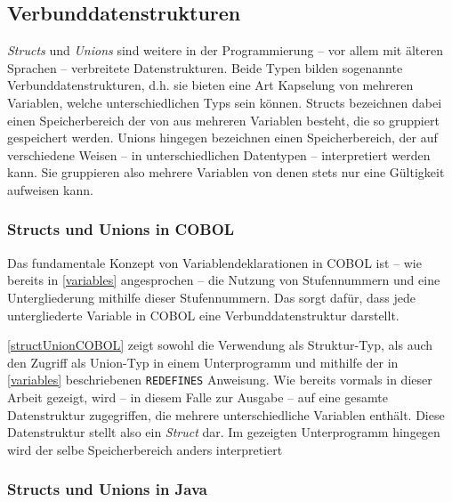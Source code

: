 \subsection{Verbunddatenstrukturen}
\textit{Structs} und \textit{Unions} sind weitere in der Programmierung -- vor allem mit älteren Sprachen -- verbreitete Datenstrukturen. Beide Typen bilden sogenannte Verbunddatenstrukturen, d.h. sie bieten eine Art Kapselung von mehreren Variablen, welche unterschiedlichen Typs sein können. Structs bezeichnen dabei einen Speicherbereich der von aus mehreren Variablen besteht, die so gruppiert gespeichert werden. Unions hingegen bezeichnen einen Speicherbereich, der auf verschiedene Weisen -- in unterschiedlichen Datentypen -- interpretiert werden kann. Sie gruppieren also mehrere Variablen von denen stets nur eine Gültigkeit aufweisen kann.

\subsubsection*{Structs und Unions in COBOL}

Das fundamentale Konzept von Variablendeklarationen in COBOL ist -- wie bereits in \autoref{variables} angesprochen -- die Nutzung von Stufennummern und eine Untergliederung mithilfe dieser Stufennummern. Das sorgt dafür, dass jede untergliederte Variable in COBOL eine Verbunddatenstruktur darstellt.


\autoref{structUnionCOBOL} zeigt sowohl die Verwendung als Struktur-Typ, als auch den Zugriff als Union-Typ in einem Unterprogramm und mithilfe der in \autoref{variables} beschriebenen \texttt{REDEFINES} Anweisung. Wie bereits vormals in dieser Arbeit gezeigt, wird -- in diesem Falle zur Ausgabe -- auf eine gesamte Datenstruktur zugegriffen, die mehrere unterschiedliche Variablen enthält. Diese Datenstruktur stellt also ein \textit{Struct} dar. Im gezeigten Unterprogramm hingegen wird der selbe Speicherbereich anders interpretiert


\subsubsection*{Structs und Unions in Java}

